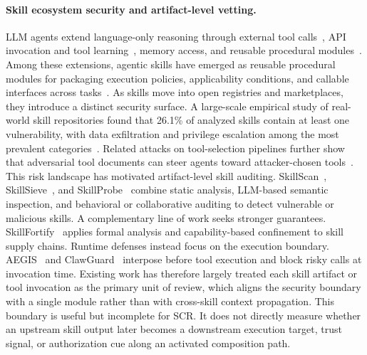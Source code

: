 \documentclass{article}
\begin{document}
\paragraph{Skill ecosystem security and artifact-level vetting.}
LLM agents extend language-only reasoning through external tool calls~\citep{yao2023react,schick2023toolformer}, API invocation and tool learning~\citep{patil2024gorilla}, memory access, and reusable procedural modules~\citep{jiang2026sokagenticskills}. Among these extensions, agentic skills have emerged as reusable procedural modules for packaging execution policies, applicability conditions, and callable interfaces across tasks~\citep{jiang2026sokagenticskills}. As skills move into open registries and marketplaces, they introduce a distinct security surface. A large-scale empirical study of real-world skill repositories found that 26.1\% of analyzed skills contain at least one vulnerability, with data exfiltration and privilege escalation among the most prevalent categories~\citep{liu2026donotmentionmaliciousskills}. Related attacks on tool-selection pipelines further show that adversarial tool documents can steer agents toward attacker-chosen tools~\citep{shi2026toolhijacker}. This risk landscape has motivated artifact-level skill auditing. SkillScan~\citep{liu2026donotmentionmaliciousskills}, SkillSieve~\citep{hou2026skillsieve}, and SkillProbe~\citep{guo2026skillprobe} combine static analysis, LLM-based semantic inspection, and behavioral or collaborative auditing to detect vulnerable or malicious skills. A complementary line of work seeks stronger guarantees. SkillFortify~\citep{bhardwaj2026formalanalysis} applies formal analysis and capability-based confinement to skill supply chains. Runtime defenses instead focus on the execution boundary. AEGIS~\citep{yuan2026aegis} and ClawGuard~\citep{zhao2026clawguard} interpose before tool execution and block risky calls at invocation time. Existing work has therefore largely treated each skill artifact or tool invocation as the primary unit of review, which aligns the security boundary with a single module rather than with cross-skill context propagation. This boundary is useful but incomplete for SCR. It does not directly measure whether an upstream skill output later becomes a downstream execution target, trust signal, or authorization cue along an activated composition path.
\end{document}
